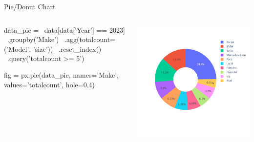 \documentclass[ignorenonframetext,xcolor=x11names]{beamer}
\begin{document}
\begin{frame}[fragile]{Pie/Donut Chart}
\begin{columns}
\begin{column}{.6\textwidth}
\begin{pythoncode}
data_pie = \
  data[data['Year'] == 2023] \
    .groupby('Make') \
    .agg(totalcount=('Model', 'size')) \
    .reset_index() \
    .query('totalcount >= 5')

fig = px.pie(data_pie, 
    names='Make', 
    values='totalcount', 
    hole=0.4)
\end{pythoncode}
\end{column}
\begin{column}{.55\textwidth}
  \includegraphics[width=\textwidth]{px.fuel.donut.pdf}
\end{column}
\end{columns}
\end{frame}

\end{document}
